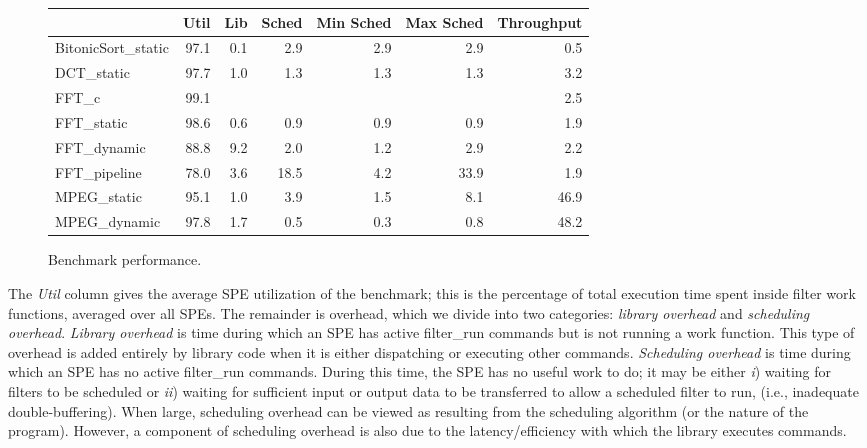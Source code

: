 \begin{figure}[!tb]
\begin{center}
\begin{tabular}{|l|r|r|r|r|r|r|}
\hline
                             & Util & Lib & Sched & Min Sched & Max Sched & Throughput \\
\hline
\textsf{BitonicSort\_static} & 97.1 & 0.1 &   2.9 &       2.9 &       2.9 &        0.5 \\
\hline
\textsf{DCT\_static}         & 97.7 & 1.0 &   1.3 &       1.3 &       1.3 &        3.2 \\
\hline
\textsf{FFT\_c}              & 99.1 &     &       &           &           &        2.5 \\
\textsf{FFT\_static}         & 98.6 & 0.6 &   0.9 &       0.9 &       0.9 &        1.9 \\
\textsf{FFT\_dynamic}        & 88.8 & 9.2 &   2.0 &       1.2 &       2.9 &        2.2 \\
\textsf{FFT\_pipeline}       & 78.0 & 3.6 &  18.5 &       4.2 &      33.9 &        1.9 \\
\hline
\textsf{MPEG\_static}        & 95.1 & 1.0 &   3.9 &       1.5 &       8.1 &       46.9 \\
\textsf{MPEG\_dynamic}       & 97.8 & 1.7 &   0.5 &       0.3 &       0.8 &       48.2 \\
\hline
\end{tabular}
\end{center}
\caption{Benchmark performance.}
\label{fig:perf:stats}
\end{figure}

The \emph{Util} column gives the average SPE utilization of the benchmark;
this is the percentage of total execution time spent inside filter work functions,
averaged over all SPEs. The remainder is overhead, which we divide into two categories:
\emph{library overhead} and \emph{scheduling overhead}. \emph{Library overhead}
is time during which an SPE has active \textsf{filter\_run} commands but is not
running a work function. This type of overhead is added entirely by library code
when it is either dispatching or executing other commands.
\emph{Scheduling overhead} is time during which an SPE has no active
\textsf{filter\_run} commands. During this time, the SPE has no useful work to do;
it may be either \emph{i}) waiting for filters to be scheduled or \emph{ii})
waiting for sufficient input or output data to be transferred to allow a scheduled filter to run,
(i.e., inadequate double-buffering).
When large, scheduling overhead can be viewed as resulting from the scheduling algorithm
(or the nature of the program). However, a component of scheduling overhead is also
due to the latency/efficiency with which the library executes commands.

